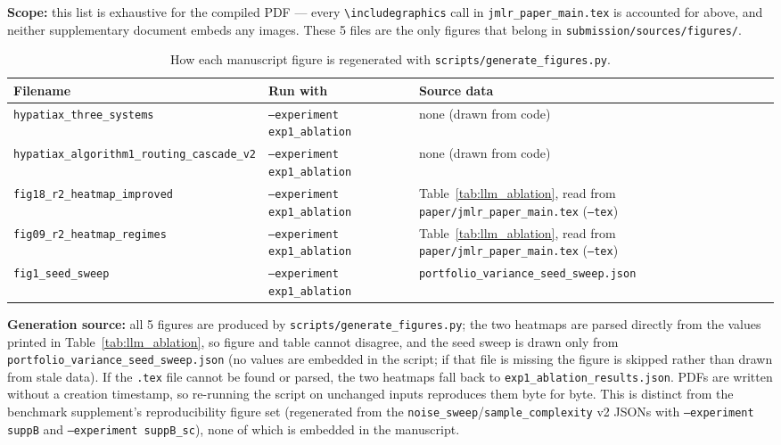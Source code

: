 \noindent\textbf{Scope:} this list is exhaustive for the compiled
PDF --- every \verb|\includegraphics| call in
\texttt{jmlr\_paper\_main.tex} is accounted for above, and neither
supplementary document embeds any images. These 5 files are the only
figures that belong in \texttt{submission/sources/figures/}.

\begin{table}[H]
\centering
\caption{How each manuscript figure is regenerated with
  \texttt{scripts/generate\_figures.py}.}
\label{tab:figlist_generation}
\small
\renewcommand{\arraystretch}{1.25}
\begin{tabular}{L{5.2cm} L{3.0cm} L{5.3cm}}
\toprule
\textbf{Filename} & \textbf{Run with} & \textbf{Source data}\\
\midrule
\texttt{hypatiax\_three\_systems} &
  \texttt{--experiment exp1\_ablation} &
  none (drawn from code)\\
\texttt{hypatiax\_algorithm1\_routing\_cascade\_v2} &
  \texttt{--experiment exp1\_ablation} &
  none (drawn from code)\\
\texttt{fig18\_r2\_heatmap\_improved} &
  \texttt{--experiment exp1\_ablation} &
  Table~\ref{tab:llm_ablation}, read from
  \texttt{paper/jmlr\_paper\_main.tex} (\texttt{--tex})\\
\texttt{fig09\_r2\_heatmap\_regimes} &
  \texttt{--experiment exp1\_ablation} &
  Table~\ref{tab:llm_ablation}, read from
  \texttt{paper/jmlr\_paper\_main.tex} (\texttt{--tex})\\
\texttt{fig1\_seed\_sweep} &
  \texttt{--experiment exp1\_ablation} &
  \texttt{portfolio\_variance\_seed\_sweep.json}\\
\bottomrule
\end{tabular}
\end{table}

\noindent\textbf{Generation source:} all 5 figures are produced by
\texttt{scripts/generate\_figures.py}; the two heatmaps are parsed
directly from the values printed in Table~\ref{tab:llm_ablation}, so
figure and table cannot disagree, and the seed sweep is drawn only from
\texttt{portfolio\_variance\_seed\_sweep.json} (no values are embedded in
the script; if that file is missing the figure is skipped rather than
drawn from stale data). If the \texttt{.tex} file cannot be found or
parsed, the two heatmaps fall back to
\texttt{exp1\_ablation\_results.json}. PDFs are written without a
creation timestamp, so re-running the script on unchanged inputs
reproduces them byte for byte. This is distinct from the benchmark
supplement's reproducibility figure set (regenerated from the
\texttt{noise\_sweep}/\texttt{sample\_complexity} v2 JSONs with
\texttt{--experiment suppB} and \texttt{--experiment suppB\_sc}), none of
which is embedded in the manuscript.
